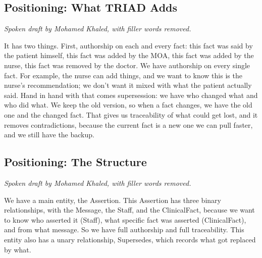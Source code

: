 \documentclass[sigconf]{acmart}
\begin{document}
\subsection{Positioning: What TRIAD Adds}
\textit{Spoken draft by Mohamed Khaled, with filler words removed.}

It has two things. First, authorship on each and every fact: this fact was said by the patient himself, this fact was added by the MOA, this fact was added by the nurse, this fact was removed by the doctor. We have authorship on every single fact. For example, the nurse can add things, and we want to know this is the nurse's recommendation; we don't want it mixed with what the patient actually said. Hand in hand with that comes supersession: we have who changed what and who did what. We keep the old version, so when a fact changes, we have the old one and the changed fact. That gives us traceability of what could get lost, and it removes contradictions, because the current fact is a new one we can pull faster, and we still have the backup.

\subsection{Positioning: The Structure}
\textit{Spoken draft by Mohamed Khaled, with filler words removed.}

We have a main entity, the Assertion. This Assertion has three binary relationships, with the Message, the Staff, and the ClinicalFact, because we want to know who asserted it (Staff), what specific fact was asserted (ClinicalFact), and from what message. So we have full authorship and full traceability. This entity also has a unary relationship, Supersedes, which records what got replaced by what.
\end{document}
